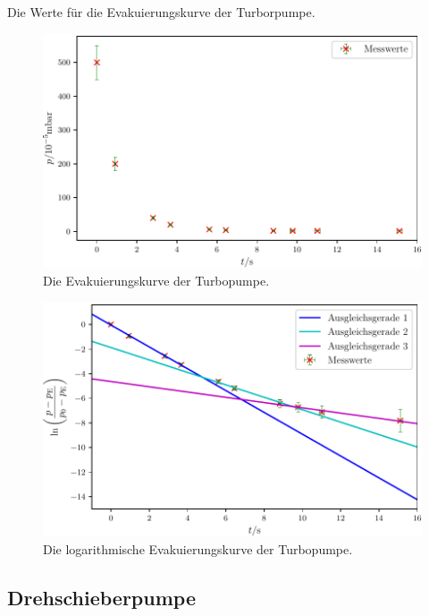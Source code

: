\begin{table}
\centering
\caption{Die Werte für die Evakuierungskurve der Turborpumpe.}

\label{tab:TS}
\end{table}

\begin{figure}
\centering
\includegraphics[width=\linewidth-70pt,height=\textheight-70pt,keepaspectratio]{content/images/TSE.pdf}
\caption{Die Evakuierungskurve der Turbopumpe.}
\label{fig:TSE}
\end{figure}

\begin{figure}
\centering
\includegraphics[width=\linewidth-70pt,height=\textheight-70pt,keepaspectratio]{content/images/TSL.pdf}
\caption{Die logarithmische Evakuierungskurve der Turbopumpe.}
\label{fig:TSL}
\end{figure}

\subsection{Drehschieberpumpe}

